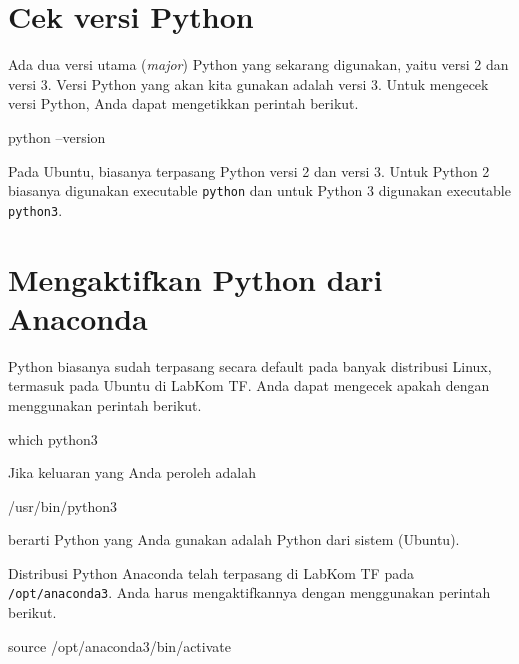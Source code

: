 \documentclass[a4paper,11pt]{extarticle}
\begin{document}
\section{Cek versi Python}

Ada dua versi utama (\textit{major}) Python yang sekarang digunakan, yaitu
versi 2 dan versi 3.
Versi Python yang akan kita gunakan adalah versi 3. Untuk mengecek versi Python,
Anda dapat mengetikkan perintah berikut.
\begin{textcode}
python --version
\end{textcode}
Pada Ubuntu, biasanya terpasang Python versi 2 dan versi 3. Untuk Python 2 biasanya
digunakan executable \texttt{python} dan untuk Python 3 digunakan
executable \texttt{python3}.


\section{Mengaktifkan Python dari Anaconda}

Python biasanya sudah terpasang secara default pada banyak distribusi Linux, termasuk
pada Ubuntu di LabKom TF. Anda dapat mengecek apakah dengan menggunakan perintah
berikut.
\begin{textcode}
which python3
\end{textcode}
Jika keluaran yang Anda peroleh adalah
\begin{textcode}
/usr/bin/python3
\end{textcode}
berarti Python yang Anda gunakan adalah Python dari sistem (Ubuntu).

Distribusi Python Anaconda telah terpasang di LabKom TF pada \texttt{/opt/anaconda3}.
Anda harus mengaktifkannya dengan menggunakan perintah berikut.
\begin{textcode}
source /opt/anaconda3/bin/activate
\end{textcode}

















\end{document}
